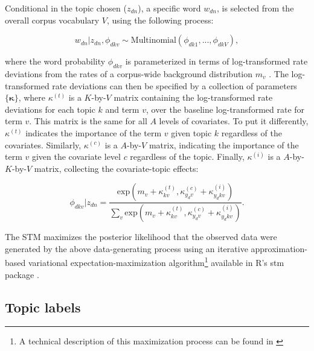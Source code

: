 \documentclass[12pt,a4paper,notitlepage]{article}
\begin{document}
Conditional in the topic chosen ($z_{dn}$), a specific word $w_{dn}$, is selected from the overall corpus vocabulary $V$, using the following process:

\begin{equation}
	w_{dn}|z_{dn},\phi_{dkv} \sim \textrm{Multinomial}(\phi_{dk1},...,\phi_{dkV}),
\end{equation}

where the word probability $\phi_{dkv}$ is parameterized in terms of log-transformed rate deviations from the rates of a corpus-wide background distribution $m_v$ \citep{roberts_structural_2013}. The log-transformed rate deviations can then be specified by a collection of parameters $\lbrace \boldsymbol{\kappa} \rbrace$, where $\kappa^{(t)}$ is a $K$-by-$V$ matrix containing the log-transformed rate deviations for each topic $k$ and term $v$, over the baseline log-transformed rate for term $v$. This matrix is the same for all $A$ levels of covariates. To put it differently, $\kappa^{(t)}$ indicates the importance of the term $v$ given topic $k$ regardless of the covariates. Similarly, $\kappa^{(c)}$ is a $A$-by-$V$ matrix, indicating the importance of the term $v$ given the covariate level $c$ regardless of the topic. Finally, $\kappa^{(i)}$ is a $A$-by-$K$-by-$V$ matrix, collecting the covariate-topic effects:

\begin{equation}
	\phi_{dkv}|z_{dn}=\frac{\textrm{exp}(m_v+\kappa^{(t)}_{kv},\kappa^{(c)}_{y_dv}+\kappa^{(i)}_{y_dkv})}{\sum_v \textrm{exp}(m_v+\kappa^{(t)}_{kv},\kappa^{(c)}_{y_dv}+\kappa^{(i)}_{y_dkv})}.
\end{equation}

The STM maximizes the posterior likelihood that the observed data were generated by the above data-generating process using an iterative approximation-based variational expectation-maximization algorithm\footnote{A technical description of this maximization process can be found in \citet{roberts_model_2016}} available in R's stm package \citep{roberts_stm:_2016}. 

\subsection{Topic labels}\label{a_labels}


\end{document}
